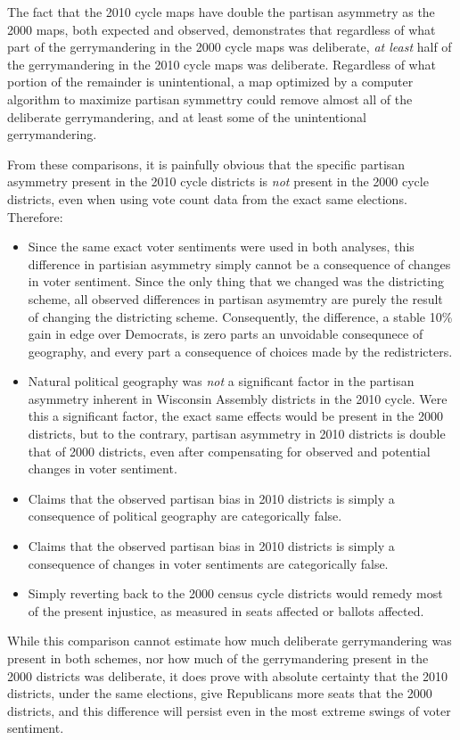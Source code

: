 \documentclass[preprint,12pt]{article}
\begin{document}
The fact that the 2010 cycle maps have double the partisan asymmetry as the 2000 maps, both expected and observed, demonstrates that regardless of what part of the gerrymandering in the 2000 cycle maps was deliberate, \emph{at least} half of the gerrymandering in the 2010 cycle maps was deliberate.
Regardless of what portion of the remainder is unintentional, a map optimized by a computer algorithm to maximize partisan symmettry could remove almost all of the deliberate gerrymandering, and at least some of the unintentional gerrymandering.

From these comparisons, it is painfully obvious that the specific partisan asymmetry present in the 2010 cycle districts is \emph{not} present in the 2000 cycle districts, even when using vote count data from the exact same elections.  Therefore:
\begin{itemize}
\item Since the same exact voter sentiments were used in both analyses, this difference in partisian asymmetry simply cannot be a consequence of changes in voter sentiment.  
Since the only thing that we changed was the districting scheme, all observed differences in partisan asymemtry are purely the result of changing the districting scheme.
Consequently, the difference, a stable 10\% gain in edge over Democrats, is zero parts an unvoidable consequnece of geography, and every part a consequence of choices made by the redistricters.
\item Natural political geography was \emph{not} a significant factor in the partisan asymmetry inherent in Wisconsin Assembly districts in the 2010 cycle.  
Were this a significant factor, the exact same effects would be present in the 2000 districts, but to the contrary, partisan asymmetry in 2010 districts is double that of 2000 districts, even after compensating for observed and potential changes in voter sentiment.
\item Claims that the observed partisan bias in 2010 districts is simply a consequence of political geography are categorically false.
\item Claims that the observed partisan bias in 2010 districts is simply a consequence of changes in voter sentiments are categorically false.
\item Simply reverting back to the 2000 census cycle districts would remedy most of the present injustice, as measured in seats affected or ballots affected.
\end{itemize}

While this comparison cannot estimate how much deliberate gerrymandering was present in both schemes, 
nor how much of the gerrymandering present in the 2000 districts was deliberate, 
it does prove with absolute certainty that the 2010 districts, under the same elections, give Republicans more seats that the 2000 districts, and this difference will persist even in the most extreme swings of voter sentiment.
\end{document}
